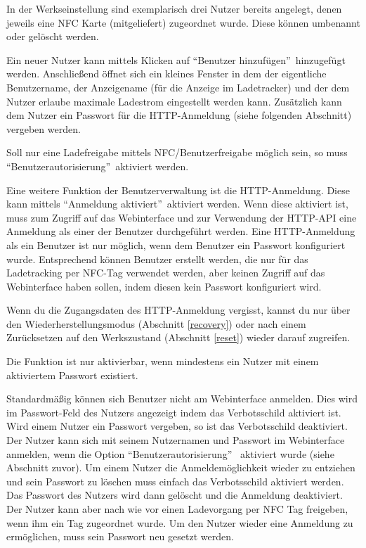 \documentclass[a4paper,10pt]{article}
\newcommand{\hint}[1]{\begin{tcolorbox}[colback=boxgray,colframe=black,coltext=
white,title=Hinweis,left*=2mm,right*=2mm,boxsep=1mm,bottom=1mm,top=1mm]#1\end{tcolorbox}}
\begin{document}
\begin{multicols*}{2}
    In der Werkseinstellung sind exemplarisch drei Nutzer bereits angelegt,
    denen jeweils eine NFC Karte (mitgeliefert) zugeordnet wurde. Diese können
    umbenannt oder gelöscht werden.

    Ein neuer Nutzer kann mittels Klicken auf \enquote{Benutzer hinzufügen}~hinzugefügt werden.
    Anschließend öffnet sich ein kleines Fenster in dem der eigentliche Benutzername, der Anzeigename (für die Anzeige im Ladetracker)
    und der dem Nutzer erlaube maximale Ladestrom eingestellt werden kann.
    Zusätzlich kann dem Nutzer ein Passwort für die HTTP-Anmeldung (siehe
    folgenden Abschnitt) vergeben werden.

    Soll nur eine Ladefreigabe mittels NFC/Benutzerfreigabe möglich sein, so
    muss \enquote{Benutzerautorisierung}~aktiviert werden.

    Eine weitere Funktion der Benutzerverwaltung ist die HTTP-Anmeldung. Diese
    kann mittels \enquote{Anmeldung aktiviert}~aktiviert werden. Wenn diese aktiviert ist, muss zum Zugriff auf das Webinterface und zur Verwendung
    der HTTP-API eine Anmeldung als einer der Benutzer durchgeführt werden. Eine HTTP-Anmeldung als ein Benutzer ist nur möglich, wenn
    dem Benutzer ein Passwort konfiguriert wurde. Entsprechend können Benutzer erstellt werden, die nur für das Ladetracking per NFC-Tag
    verwendet werden, aber keinen Zugriff auf das Webinterface haben sollen, indem diesen kein Passwort konfiguriert wird.
    \hint{Wenn du die Zugangsdaten des HTTP-Anmeldung vergisst, kannst du nur
    über den Wiederherstellungsmodus (Abschnitt \ref{recovery}) oder nach einem
    Zurücksetzen auf den Werkszustand (Abschnitt \ref{reset}) wieder darauf zugreifen.}
    Die Funktion ist nur aktivierbar, wenn mindestens ein Nutzer mit einem
    aktiviertem Passwort existiert.

    Standardmäßig können sich Benutzer nicht am Webinterface anmelden. Dies wird
    im Passwort-Feld des Nutzers angezeigt indem das Verbotsschild aktiviert
    ist. Wird einem Nutzer ein Passwort vergeben, so ist das Verbotsschild
    deaktiviert. Der Nutzer kann sich mit seinem Nutzernamen und Passwort im
    Webinterface anmelden, wenn die Option \enquote{Benutzerautorisierung}
    ~aktiviert wurde (siehe Abschnitt zuvor).
    Um einem Nutzer die Anmeldemöglichkeit wieder zu entziehen und sein Passwort
    zu löschen muss einfach das Verbotsschild aktiviert werden. Das Passwort des
    Nutzers wird dann gelöscht und die Anmeldung deaktiviert. Der Nutzer kann
    aber nach wie vor einen Ladevorgang per NFC Tag freigeben, wenn ihm ein Tag
    zugeordnet wurde. Um den Nutzer wieder eine Anmeldung zu ermöglichen, muss
    sein Passwort neu gesetzt werden.


\end{multicols*}
\end{document}

